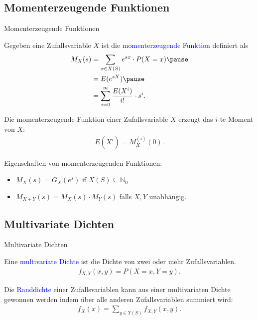 \documentclass{beamer}
\def\padding{\vspace{0.5cm}}
\def\spadding{\vspace{0.25cm}}
\def\b{\textcolor{blue}}
\begin{document}
\subsection{Momenterzeugende Funktionen}
\begin{frame}{Momenterzeugende Funktionen}
    \begin{definition}
       Gegeben eine Zufallsvariable $X$ ist die \b{momenterzeugende Funktion} definiert als
        \begin{align*}
            M_X(s) &= \sum_{x \in X(S)} e^{s x} \cdot P(X=x)\pause \\
                   &= E(e^{s X})\pause \\
                   &= \sum_{i=0}^{\infty} \frac{E(X^i)}{i!} \cdot s^i.
        \end{align*}
    \end{definition}\pause\par\padding
    Die momenterzeugende Funktion einer Zufallsvariable $X$ erzeugt das $i$-te Moment von $X$:
    \begin{align*}
        E(X^i) = M_X^{(i)}(0).
    \end{align*}
\end{frame}

\begin{frame}
    Eigenschaften von momenterzeugenden Funktionen:\pause
    \begin{itemize}
        \item $M_X(s) = G_X(e^s)$ if $X(S) \subseteq \mathbb{N}_0$ \pause
        \item $M_{X + Y}(s) = M_X(s) \cdot M_Y(s)$ falls $X,Y$ unabhängig.
    \end{itemize}
\end{frame}

\subsection{Multivariate Dichten}
\begin{frame}{Multivariate Dichten}
    \begin{definition}
        Eine \b{multivariate Dichte} ist die Dichte von zwei oder mehr Zufallsvariablen.
        \begin{align*}
            f_{X,Y}(x,y) = P(X = x, Y = y).
        \end{align*}\pause\par\spadding
        Die \b{Randdichte} einer Zufallsvariablen kann aus einer multivariaten Dichte gewonnen werden indem über alle anderen Zufallsvariablen summiert wird:
        \begin{align*}
            f_X(x) = \sum_{y \in Y(S)} f_{X,Y}(x,y).
        \end{align*}
    \end{definition}
\end{frame}
\end{document}

